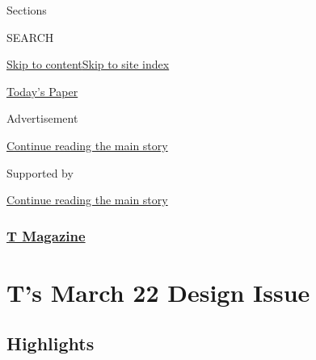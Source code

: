 Sections

SEARCH

\protect\hyperlink{site-content}{Skip to
content}\protect\hyperlink{site-index}{Skip to site index}

\href{https://myaccount.nytimes3xbfgragh.onion/auth/login?response_type=cookie\&client_id=vi}{}

\href{https://www.nytimes3xbfgragh.onion/section/todayspaper}{Today's
Paper}

Advertisement

\protect\hyperlink{after-top}{Continue reading the main story}

Supported by

\protect\hyperlink{after-sponsor}{Continue reading the main story}

\hypertarget{t-magazine}{%
\subsubsection{\texorpdfstring{\href{/section/t-magazine}{T
Magazine}}{T Magazine}}\label{t-magazine}}

\hypertarget{ts-march-22-design-issue}{%
\section{T's March 22 Design Issue}\label{ts-march-22-design-issue}}

\hypertarget{highlights}{%
\subsection{Highlights}\label{highlights}}

